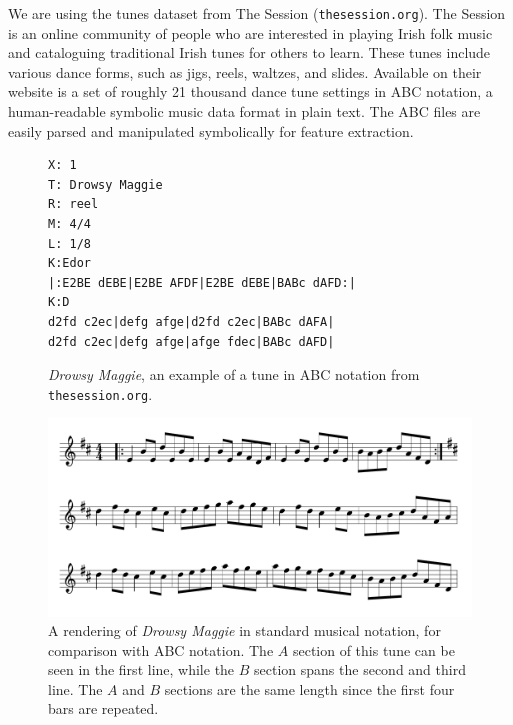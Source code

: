 \documentclass{article} %
\begin{document}
We are using the tunes dataset from The Session (\texttt{thesession.org}). The
Session is an online community of people who are interested in playing Irish
folk music and cataloguing traditional Irish tunes for others to learn. These
tunes include various dance forms, such as jigs, reels, waltzes, and slides.
Available on their website is a set of roughly 21 thousand dance tune settings
in ABC notation, a human-readable symbolic music data format in plain text. The
ABC files are easily parsed and manipulated symbolically for feature extraction.
\FloatBarrier
\begin{figure}
  \begin{verbatim}
X: 1
T: Drowsy Maggie
R: reel
M: 4/4
L: 1/8
K:Edor
|:E2BE dEBE|E2BE AFDF|E2BE dEBE|BABc dAFD:|
K:D
d2fd c2ec|defg afge|d2fd c2ec|BABc dAFA|
d2fd c2ec|defg afge|afge fdec|BABc dAFD|
  \end{verbatim}
  \caption{\textit{Drowsy Maggie}, an example of a tune in ABC notation from
  \texttt{thesession.org}.}
\end{figure}
\begin{figure}
  \begin{center}
    \includegraphics[width=5in]{drowsymaggie.png}
  \end{center}
  \caption{A rendering of \textit{Drowsy Maggie} in standard musical notation, for
  comparison with ABC notation. The $A$ section of this tune can be seen in the
first line, while the $B$ section spans the second and third line. The $A$ and
$B$ sections are the same length since the first four bars are repeated.}
\end{figure}
\FloatBarrier
\end{document}
